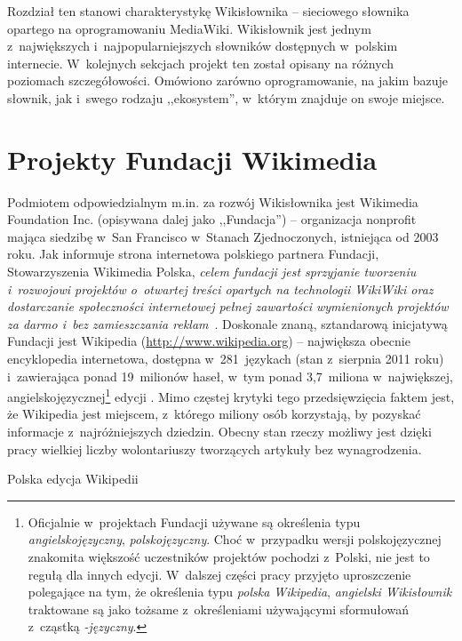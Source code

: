 Rozdział ten stanowi charakterystykę Wikisłownika -- sieciowego słownika opartego na oprogramowaniu MediaWiki. Wikisłownik jest jednym z~największych i~najpopularniejszych słowników dostępnych w~polskim internecie. W~kolejnych sekcjach projekt ten został opisany na różnych poziomach szczegółowości. Omówiono zarówno oprogramowanie, na jakim bazuje słownik, jak i~swego rodzaju ,,ekosystem'', w~którym znajduje on swoje miejsce.

\section{Projekty Fundacji Wikimedia}
Podmiotem odpowiedzialnym m.in. za rozwój Wikisłownika jest Wikimedia Foundation Inc. (opisywana dalej jako ,,Fundacja'') -- organizacja non\dywiz{}profit mająca siedzibę w~San Francisco w~Stanach Zjednoczonych, istniejąca od 2003 roku. Jak informuje strona internetowa polskiego partnera Fundacji, Stowarzyszenia Wikimedia Polska, \emph{celem fundacji jest sprzyjanie tworzeniu i~rozwojowi projektów o~otwartej treści opartych na technologii WikiWiki oraz dostarczanie społeczności internetowej pełnej zawartości wymienionych projektów za darmo i~bez zamieszczania reklam}~\cite{wm:pl}. Doskonale znaną, sztandarową inicjatywą Fundacji jest Wikipedia (\url{http://www.wikipedia.org}) -- największa obecnie encyklopedia internetowa, dostępna w~281~językach (stan z~sierpnia 2011 roku) i~zawierająca ponad 19~milionów haseł, w~tym ponad 3,7~miliona w~największej, angielskojęzycznej\footnote{Oficjalnie w~projektach Fundacji używane są określenia typu \emph{angielskojęzyczny}, \emph{polskojęzyczny}. Choć w~przypadku wersji polskojęzycznej znakomita większość uczestników projektów pochodzi z~Polski, nie jest to regułą dla innych edycji. W~dalszej części pracy przyjęto uproszczenie polegające na tym, że określenia typu \emph{polska Wikipedia}, \emph{angielski Wikisłownik} traktowane są jako tożsame z~określeniami używającymi sformułowań z~cząstką \emph{-języczny}.} edycji \cite{wiki:list}. Mimo częstej krytyki tego przedsięwzięcia faktem jest, że Wikipedia jest miejscem, z~którego miliony osób korzystają, by pozyskać informacje z~najróżniejszych dziedzin. Obecny stan rzeczy możliwy jest dzięki pracy wielkiej liczby wolontariuszy tworzących artykuły bez wynagrodzenia.

\begin{illustration}
	\caption{Polska edycja Wikipedii}
\end{illustration}

